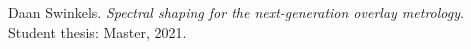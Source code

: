 \documentclass[pra,superscriptaddress,reprint,a4paper]{revtex4-1}
\begin{document}
\begin{thebibliography}{99}

Daan Swinkels.
\textit{Spectral shaping for the next-generation overlay metrology}.
Student thesis: Master, 2021.








\end{thebibliography}
\end{document}
